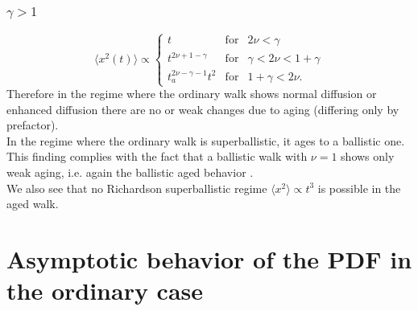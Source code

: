 \subsubsection{$\gamma> 1$ }
\begin{equation}
  \langle x^2(t) \rangle \propto  \left\{
  \begin{array}{lll}
    t & \mathrm{for} & 2\nu < \gamma  \\
    t^{2\nu+1-\gamma} &\mathrm{for} & \gamma <2 \nu < 1+\gamma \\ 
   t_a^{2\nu-\gamma-1 }t^2 & \mathrm{for} & 1+\gamma < 2\nu.
  \end{array}
  \right.
\end{equation}
Therefore in the regime where the ordinary walk shows normal diffusion or enhanced diffusion there are no or weak changes due to aging (differing only by prefactor). \\
In the regime where the ordinary walk is superballistic, it ages to a ballistic one. This finding complies with the fact that a ballistic walk with $\nu = 1$ shows only weak aging, i.e. again the ballistic aged behavior 
\cite{Magdziarz, Froemberg}. \\
We also see that no Richardson superballistic regime $\langle x^2 \rangle \propto t^3$ is possible in the aged walk. 

\section{Asymptotic behavior of the PDF in the ordinary case} 
\label{sec:calcPDF}

